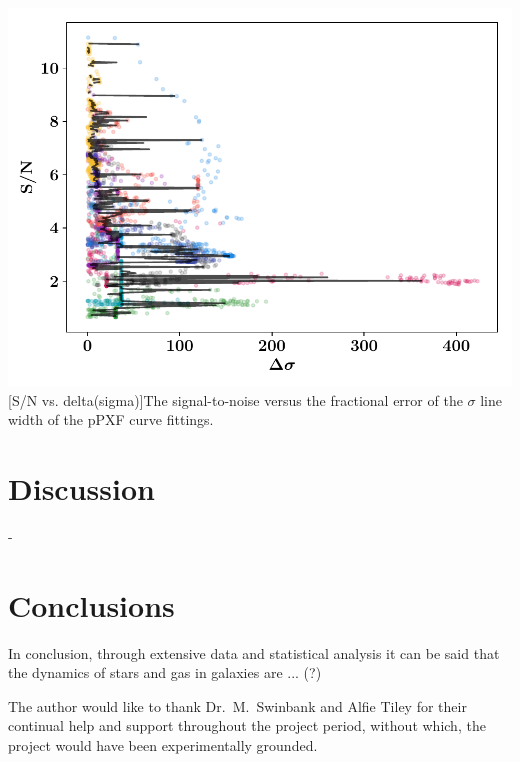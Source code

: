 \documentclass[12pt, onecolumn]{revtex4}    %
\begin{document}
\begin{center}
\includegraphics[width=0.5\linewidth]{data/reprocessed_sn_vs_delta_sigma}
[S/N vs. delta(sigma)]{The signal-to-noise versus the fractional error of the $\sigma$ line width of the pPXF curve fittings.}
\label{fig:oiiluminosity_redshift}
\end{center}

\section{Discussion} 

-

\section{Conclusions}
 
In conclusion, through extensive data and statistical analysis it can be said that the dynamics of stars and gas in galaxies are ... (?) 

\begin{acknowledgments}
The author would like to thank Dr.~M.~Swinbank and Alfie Tiley for their continual help and support throughout the project period, without which, the project would have been experimentally grounded.
\end{acknowledgments}



\end{document}
